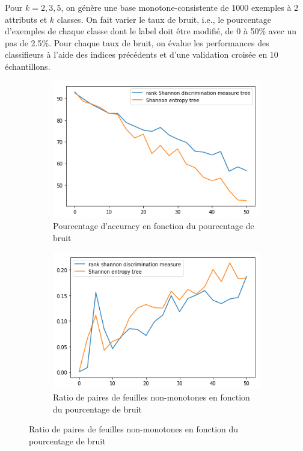 \documentclass[a4paper]{article}
\begin{document}
Pour $k=2,3,5$, on génère une base monotone-consistente de 1000 exemples à 2
attributs et $k$ classes. On fait varier le taux de bruit, i.e., le pourcentage
d'exemples de chaque classe dont le label doit être modifié, de 0 à 50\% avec un pas de
2.5\%. Pour chaque taux de bruit, on évalue les performances des classifieurs
à l'aide des indices précédents et d'une validation croisée en 10 échantillons.

\begin{figure}[H]
    \centering
    \begin{subfigure}[c]{0.46\textwidth}
        \centering
        \includegraphics[width=\textwidth]{images/cci_2.png}
        \caption{Pourcentage d'accuracy en fonction du pourcentage de bruit}
    \end{subfigure}
    \begin{subfigure}[c]{0.46\textwidth}
        \centering
        \includegraphics[width=\textwidth]{images/ratio_2.png}
        \caption{Ratio de paires de feuilles non-monotones en fonction du pourcentage de bruit}
    \end{subfigure}
    

\end{figure}
\end{document}
